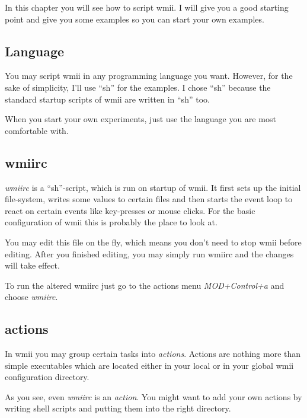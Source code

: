 \documentclass[12pt,a4paper]{article}
\begin{document}
  In this chapter you will see how to script wmii. I will give you a
  good starting point and give you some examples so you can start your
  own examples.

  \subsection{Language}

    You may script wmii in any programming language you want. However,
    for the sake of simplicity, I'll use ``sh'' for the examples. I
    chose ``sh'' because the standard startup scripts of wmii are
    written in ``sh'' too.

    When you start your own experiments, just use the language you are
    most comfortable with.

  \subsection{wmiirc}

    \emph{wmiirc} is a ``sh''-script, which is run on startup of
    wmii. It first sets up the initial file-system, writes some values
    to certain files and then starts the event loop to react on
    certain events like key-presses or mouse clicks. For the basic
    configuration of wmii this is probably the place to look at.

    You may edit this file on the fly, which means you don't need to
    stop wmii before editing. After you finished editing, you may
    simply run wmiirc and the changes will take effect.

    To run the altered wmiirc just go to the actions menu
    \emph{MOD+Control+a} and choose \emph{wmiirc}.

  \subsection{actions}

    In wmii you may group certain tasks into \emph{actions}. Actions
    are nothing more than simple executables which are located either
    in your local or in your global wmii configuration directory.


    As you see, even \emph{wmiirc} is an \emph{action}. You might want
    to add your own actions by writing shell scripts and putting them
    into the right directory.
\end{document}
